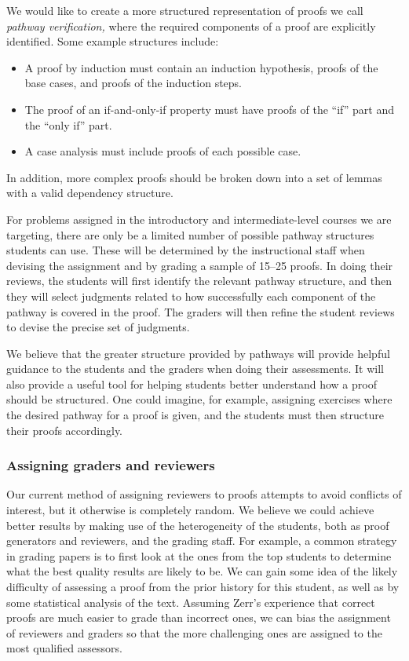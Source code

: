 \documentclass[12pt]{article}
\begin{document}
We would like to
create a more structured representation of proofs we call {\em pathway
  verification,}  where the required components of a proof are
explicitly identified.  Some example structures include:
\begin{itemize}
\item A proof by induction must contain an induction hypothesis,
  proofs of the base cases, and proofs of the induction steps.
\item The proof of an if-and-only-if property must have proofs of the
  ``if'' part and the ``only if'' part.
\item A case analysis must include proofs of each possible case.
\end{itemize}
In addition, more complex proofs should be broken down into a set of
lemmas with a valid dependency structure.

For problems assigned in the introductory and intermediate-level
courses we are targeting, there are only be a limited number of
possible pathway structures students can use.  These will be
determined by the instructional staff when devising the assignment and
by grading a sample of 15--25 proofs.  In doing their reviews, the
students will first identify the relevant pathway structure, and then
they will select judgments related to how successfully each component
of the pathway is covered in the proof.  The graders will then refine
the student reviews to devise the precise set of judgments.

We believe that the greater structure provided by pathways will
provide helpful guidance to the students and the graders when doing
their assessments.  It will also provide a useful tool for helping
students better understand how a proof should be structured.  One
could imagine, for example, assigning exercises where the
desired pathway for a proof is given, and the students must
then structure their proofs accordingly.

\subsubsection*{Assigning graders and reviewers}

Our current method of assigning reviewers to proofs attempts to avoid
conflicts of interest, but it otherwise is completely random.  We
believe we could achieve better results by making use of the
heterogeneity of the students, both as proof generators and reviewers,
and the grading staff.  For example, a common strategy in grading
papers is to first look at the ones from the top students to determine
what the best quality results are likely to be.  We can gain some idea
of the likely difficulty of assessing a proof from the prior history
for this student, as well as by some statistical analysis of the
text.  Assuming Zerr's experience that correct proofs are much easier
to grade than incorrect ones, we can bias the assignment of reviewers
and graders so that the more challenging ones are assigned to the
most qualified assessors.
\end{document}
